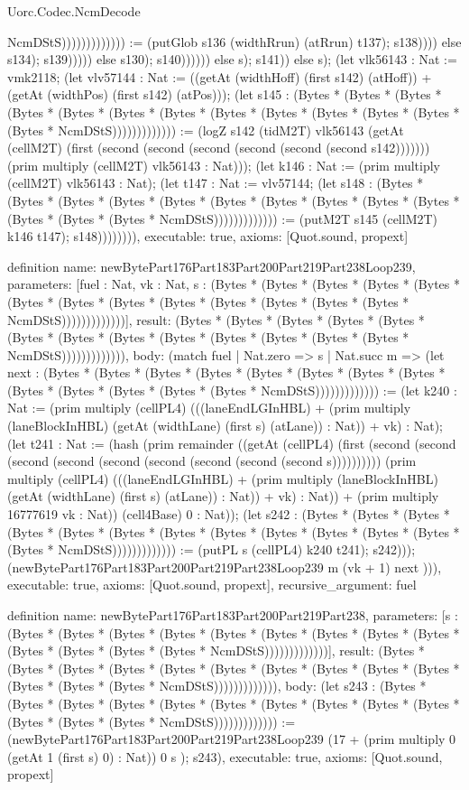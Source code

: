 \begin{lexlean}{Uorc.Codec.NcmDecode}
\begin{semanticmodule}
{NcmDStS))))))))))))) := (putGlob s136 (widthRrun) (atRrun) t137); s138)))) else s134); s139))))) else s130); s140)))))) else s); s141)) else s); (let vlk56143 : Nat := vmk2118; (let vlv57144 : Nat := ((getAt (widthHoff) (first s142) (atHoff)) + (getAt (widthPos) (first s142) (atPos))); (let s145 : (Bytes * (Bytes * (Bytes * (Bytes * (Bytes * (Bytes * (Bytes * (Bytes * (Bytes * (Bytes * (Bytes * (Bytes * (Bytes * NcmDStS))))))))))))) := (logZ s142 (tidM2T) vlk56143 (getAt (cellM2T) (first (second (second (second (second (second (second s142))))))) (prim multiply (cellM2T) vlk56143 : Nat))); (let k146 : Nat := (prim multiply (cellM2T) vlk56143 : Nat); (let t147 : Nat := vlv57144; (let s148 : (Bytes * (Bytes * (Bytes * (Bytes * (Bytes * (Bytes * (Bytes * (Bytes * (Bytes * (Bytes * (Bytes * (Bytes * (Bytes * NcmDStS))))))))))))) := (putM2T s145 (cellM2T) k146 t147); s148)))))))),
  executable: true,
  axioms: [Quot.sound, propext]
}

definition{
  name: newBytePart176Part183Part200Part219Part238Loop239,
  parameters: [fuel : Nat, vk : Nat, s : (Bytes * (Bytes * (Bytes * (Bytes * (Bytes * (Bytes * (Bytes * (Bytes * (Bytes * (Bytes * (Bytes * (Bytes * (Bytes * NcmDStS)))))))))))))],
  result: (Bytes * (Bytes * (Bytes * (Bytes * (Bytes * (Bytes * (Bytes * (Bytes * (Bytes * (Bytes * (Bytes * (Bytes * (Bytes * NcmDStS))))))))))))),
  body: (match fuel
    | Nat.zero => s
    | Nat.succ m => (let next : (Bytes * (Bytes * (Bytes * (Bytes * (Bytes * (Bytes * (Bytes * (Bytes * (Bytes * (Bytes * (Bytes * (Bytes * (Bytes * NcmDStS))))))))))))) := (let k240 : Nat := (prim multiply (cellPL4) (((laneEndLGInHBL) + (prim multiply (laneBlockInHBL) (getAt (widthLane) (first s) (atLane)) : Nat)) + vk) : Nat); (let t241 : Nat := (hash (prim remainder ((getAt (cellPL4) (first (second (second (second (second (second (second (second (second (second s)))))))))) (prim multiply (cellPL4) (((laneEndLGInHBL) + (prim multiply (laneBlockInHBL) (getAt (widthLane) (first s) (atLane)) : Nat)) + vk) : Nat)) + (prim multiply 16777619 vk : Nat)) (cell4Base) 0 : Nat)); (let s242 : (Bytes * (Bytes * (Bytes * (Bytes * (Bytes * (Bytes * (Bytes * (Bytes * (Bytes * (Bytes * (Bytes * (Bytes * (Bytes * NcmDStS))))))))))))) := (putPL s (cellPL4) k240 t241); s242))); (newBytePart176Part183Part200Part219Part238Loop239 m (vk + 1) next ))),
  executable: true,
  axioms: [Quot.sound, propext],
  recursive_argument: fuel
}

definition{
  name: newBytePart176Part183Part200Part219Part238,
  parameters: [s : (Bytes * (Bytes * (Bytes * (Bytes * (Bytes * (Bytes * (Bytes * (Bytes * (Bytes * (Bytes * (Bytes * (Bytes * (Bytes * NcmDStS)))))))))))))],
  result: (Bytes * (Bytes * (Bytes * (Bytes * (Bytes * (Bytes * (Bytes * (Bytes * (Bytes * (Bytes * (Bytes * (Bytes * (Bytes * NcmDStS))))))))))))),
  body: (let s243 : (Bytes * (Bytes * (Bytes * (Bytes * (Bytes * (Bytes * (Bytes * (Bytes * (Bytes * (Bytes * (Bytes * (Bytes * (Bytes * NcmDStS))))))))))))) := (newBytePart176Part183Part200Part219Part238Loop239 (17 + (prim multiply 0 (getAt 1 (first s) 0) : Nat)) 0 s ); s243),
  executable: true,
  axioms: [Quot.sound, propext]
}


\end{semanticmodule}
\end{lexlean}
